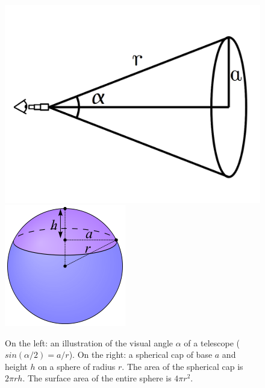 \documentclass{article}
\begin{document}
\begin{figure}[htbp]
\begin{center}
\includegraphics[scale=0.20]{14_images/Visual_angle.png}\hspace{3cm}
\includegraphics[scale=0.50]{14_images/Spherical_Cap.png}
\caption{On the left: an illustration of the visual angle $\alpha$ of a telescope ($sin(\alpha/2) = a/r$).
On the right: a spherical cap of base $a$ and height $h$ on a sphere of radius $r$. The area of the spherical cap is $2\pi r h$.
The surface area of the entire sphere is $4\pi r^2$.}
\label{default}
\end{center}
\end{figure}
\end{document}
